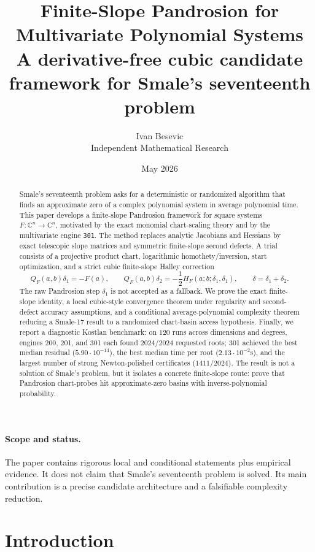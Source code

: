 \documentclass[11pt]{article}
\title{Finite-Slope Pandrosion for Multivariate Polynomial Systems\\[3pt]
\large A derivative-free cubic candidate framework for Smale's seventeenth problem}
\author{Ivan Besevic\\Independent Mathematical Research}
\date{May 2026}
\newcommand{\C}{\mathbb C}
\begin{document}
\maketitle

\begin{abstract}
Smale's seventeenth problem asks for a deterministic or randomized algorithm that finds an approximate zero of a complex polynomial system in average polynomial time.  This paper develops a finite-slope Pandrosion framework for square systems $F:\C^n\to\C^n$, motivated by the exact monomial chart-scaling theory and by the multivariate engine \texttt{301}.  The method replaces analytic Jacobians and Hessians by exact telescopic slope matrices and symmetric finite-slope second defects.  A trial consists of a projective product chart, logarithmic homothety/inversion, start optimization, and a strict cubic finite-slope Halley correction
\[
        Q_F(a,b)\delta_1=-F(a),\qquad
        Q_F(a,b)\delta_2=-\frac12 H_F(a;b;\delta_1,\delta_1),
        \qquad \delta=\delta_1+\delta_2.
\]
The raw Pandrosion step $\delta_1$ is not accepted as a fallback.  We prove the exact finite-slope identity, a local cubic-style convergence theorem under regularity and second-defect accuracy assumptions, and a conditional average-polynomial complexity theorem reducing a Smale-17 result to a randomized chart-basin access hypothesis.  Finally, we report a diagnostic Kostlan benchmark: on $120$ runs across dimensions and degrees, engines 200, 201, and 301 each found $2024/2024$ requested roots; 301 achieved the best median residual ($5.90\cdot10^{-14}$), the best median time per root ($2.13\cdot10^{-2}$s), and the largest number of strong Newton-polished certificates ($1411/2024$).  The result is not a solution of Smale's problem, but it isolates a concrete finite-slope route: prove that Pandrosion chart-probes hit approximate-zero basins with inverse-polynomial probability.
\end{abstract}

\paragraph{Scope and status.}
The paper contains rigorous local and conditional statements plus empirical evidence.  It does not claim that Smale's seventeenth problem is solved.  Its main contribution is a precise candidate architecture and a falsifiable complexity reduction.

\section{Introduction}
\end{document}
